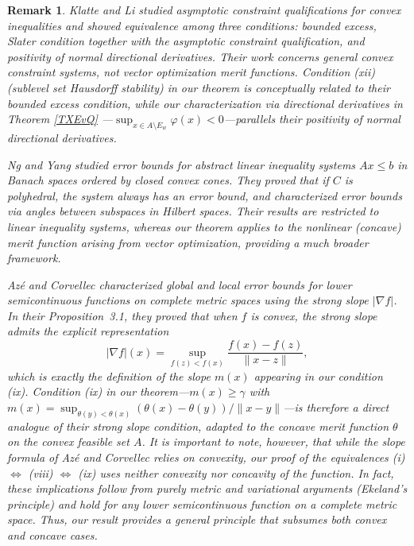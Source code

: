 \documentclass[11pt]{article}
\newtheorem{remark}{Remark}[section]
\begin{document}
\begin{remark}
 
 
 
 
 Klatte and Li  	\cite{KL1999}  studied asymptotic constraint qualifications for convex inequalities and showed equivalence among three conditions: bounded excess, Slater condition together with the asymptotic constraint qualification, and positivity of normal directional derivatives. Their work concerns general convex constraint systems, not vector optimization merit functions. Condition (xii) (sublevel set Hausdorff stability) in our theorem is conceptually related to their bounded excess condition, while our characterization via directional derivatives in Theorem  \ref{TXEvQ} ---\(\sup_{x\in A\setminus E_w}\varphi(x)<0\)---parallels their positivity of normal directional derivatives.
 		
 Ng and Yang   	\cite{NgYang2002}   studied error bounds for abstract linear inequality systems \(Ax\le b\) in Banach spaces ordered by closed convex cones. They proved that if \(C\) is polyhedral, the system always has an error bound, and characterized error bounds via angles between subspaces in Hilbert spaces. Their results are restricted to linear inequality systems, whereas our theorem applies to the nonlinear (concave) merit function arising from vector optimization, providing a much broader framework.
 		
 	 		
 Az\'e and Corvellec   \cite{AC2004}   characterized global and local error bounds for lower semicontinuous functions on complete metric spaces using the strong slope \(|\nabla f|\). In their Proposition~3.1, they proved that when \(f\) is convex, the strong slope admits the explicit representation
 		\[
 		|\nabla f|(x) = \sup_{f(z) < f(x)} \frac{f(x) - f(z)}{\|x - z\|},
 		\]
 		which is exactly the definition of the slope \(m(x)\) appearing in our condition (ix). Condition (ix) in our theorem---\(m(x)\ge \gamma\) with \(m(x)=\sup_{\theta(y)<\theta(x)}(\theta(x)-\theta(y))/\|x-y\|\)---is therefore a direct analogue of their strong slope condition, adapted to the concave merit function \(\theta\) on the convex feasible set \(A\). It is important to note, however, that while the slope formula of Az\'e and Corvellec relies on convexity, our proof of the equivalences (i) \(\Leftrightarrow\) (viii) \(\Leftrightarrow\) (ix) uses neither convexity nor concavity of the function. In fact, these implications follow from purely metric and variational arguments (Ekeland's principle) and hold for any lower semicontinuous function on a complete metric space. Thus, our result   provides a general principle that subsumes both convex and concave cases.
 		

\end{remark}
\end{document}
